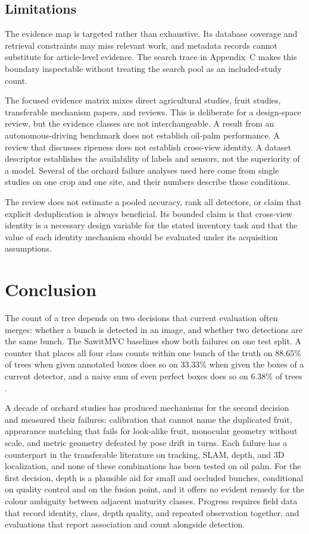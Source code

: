 \subsection{Limitations}
\label{sec:limitations}

The evidence map is targeted rather than exhaustive. Its database coverage and retrieval constraints may miss relevant work, and metadata records cannot substitute for article-level evidence. The search trace in Appendix~C makes this boundary inspectable without treating the search pool as an included-study count.

The focused evidence matrix mixes direct agricultural studies, fruit studies, transferable mechanism papers, and reviews. This is deliberate for a design-space review, but the evidence classes are not interchangeable. A result from an autonomous-driving benchmark does not establish oil-palm performance. A review that discusses ripeness does not establish cross-view identity. A dataset descriptor establishes the availability of labels and sensors, not the superiority of a model. Several of the orchard failure analyses used here come from single studies on one crop and one site, and their numbers describe those conditions.

The review does not estimate a pooled accuracy, rank all detectors, or claim that explicit deduplication is always beneficial. Its bounded claim is that cross-view identity is a necessary design variable for the stated inventory task and that the value of each identity mechanism should be evaluated under its acquisition assumptions.

\section{Conclusion}

The count of a tree depends on two decisions that current evaluation often merges: whether a bunch is detected in an image, and whether two detections are the same bunch. The SawitMVC baselines show both failures on one test split. A counter that places all four class counts within one bunch of the truth on 88.65\% of trees when given annotated boxes does so on 33.33\% when given the boxes of a current detector, and a naive sum of even perfect boxes does so on 6.38\% of trees \cite{indriani2026sawitmvc}.

A decade of orchard studies has produced mechanisms for the second decision and measured their failures: calibration that cannot name the duplicated fruit, appearance matching that fails for look-alike fruit, monocular geometry without scale, and metric geometry defeated by pose drift in turns. Each failure has a counterpart in the transferable literature on tracking, SLAM, depth, and 3D localization, and none of these combinations has been tested on oil palm. For the first decision, depth is a plausible aid for small and occluded bunches, conditional on quality control and on the fusion point, and it offers no evident remedy for the colour ambiguity between adjacent maturity classes. Progress requires field data that record identity, class, depth quality, and repeated observation together, and evaluations that report association and count alongside detection.


